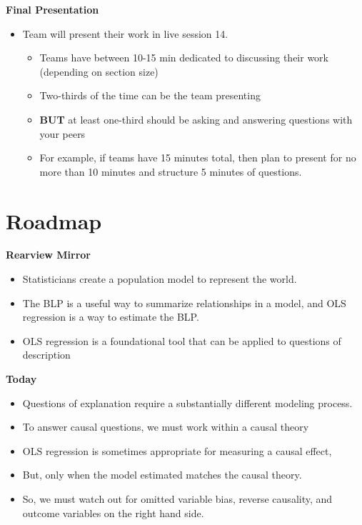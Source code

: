 \documentclass[
]{book}
\providecommand{\tightlist}{%
  \setlength{\itemsep}{0pt}\setlength{\parskip}{0pt}}
\theoremstyle{definition}
\theoremstyle{definition}
\theoremstyle{definition}
\theoremstyle{definition}
\theoremstyle{remark}
\begin{document}
\textbf{Final Presentation}

\begin{itemize}
\tightlist
\item
  Team will present their work in live session 14.

  \begin{itemize}
  \tightlist
  \item
    Teams have between 10-15 min dedicated to discussing their work (depending on section size)
  \item
    Two-thirds of the time can be the team presenting
  \item
    \textbf{BUT} at least one-third should be asking and answering questions with your peers
  \item
    For example, if teams have 15 minutes total, then plan to present for no more than 10 minutes and structure 5 minutes of questions.
  \end{itemize}
\end{itemize}

\hypertarget{roadmap-7}{%
\section{Roadmap}\label{roadmap-7}}

\textbf{Rearview Mirror}

\begin{itemize}
\tightlist
\item
  Statisticians create a population model to represent the world.
\item
  The BLP is a useful way to summarize relationships in a model, and OLS regression is a way to estimate the BLP.
\item
  OLS regression is a foundational tool that can be applied to questions of description
\end{itemize}

\textbf{Today}

\begin{itemize}
\tightlist
\item
  Questions of explanation require a substantially different modeling process.
\item
  To answer causal questions, we must work within a causal theory
\item
  OLS regression is sometimes appropriate for measuring a causal effect,
\item
  But, only when the model estimated matches the causal theory.
\item
  So, we must watch out for omitted variable bias, reverse causality, and outcome variables on the right hand side.
\end{itemize}
\end{document}
